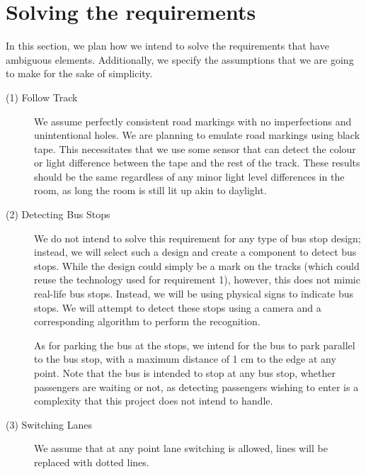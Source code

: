 \section{Solving the requirements} \label{solvingRequirements}
In this section, we plan how we intend to solve the requirements that have ambiguous elements. Additionally, we specify the assumptions that we are going to make for the sake of simplicity. 

\begin{description}
    \item [(1) Follow Track]
    We assume perfectly consistent road markings with no imperfections and unintentional holes. We are planning to emulate road markings using black tape. This necessitates that we use some sensor that can detect the colour or light difference between the tape and the rest of the track. These results should be the same regardless of any minor light level differences in the room, as long the room is still lit up akin to daylight. 

    \item[(2) Detecting Bus Stops]
    We do not intend to solve this requirement for any type of bus stop design; instead, we will select such a design and create a component to detect bus stops. While the design could simply be a mark on the tracks (which could reuse the technology used for requirement 1), however, this does not mimic real-life bus stops. Instead, we will be using physical signs to indicate bus stops. We will attempt to detect these stops using a camera and a corresponding algorithm to perform the recognition. 
    
    As for parking the bus at the stops, we intend for the bus to park parallel to the bus stop, with a maximum distance of 1 cm to the edge at any point. Note that the bus is intended to stop at any bus stop, whether passengers are waiting or not, as detecting passengers wishing to enter is a complexity that this project does not intend to handle. 

    \item[(3) Switching Lanes] 
    We assume that at any point lane switching is allowed, lines will be replaced with dotted lines. 


\end{description}
